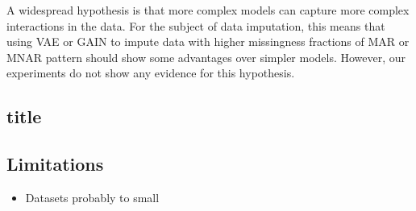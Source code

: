 A widespread hypothesis is that more complex models can capture more complex interactions in the data. For the subject of data imputation, this means that using VAE or GAIN to impute data with higher missingness fractions of MAR or MNAR pattern should show some advantages over simpler models. However, our experiments do not show any evidence for this hypothesis.


\subsection{}
%


\subsection{title}


\subsection{Limitations}
%

\begin{itemize}
	\item Datasets probably to small
\end{itemize}

